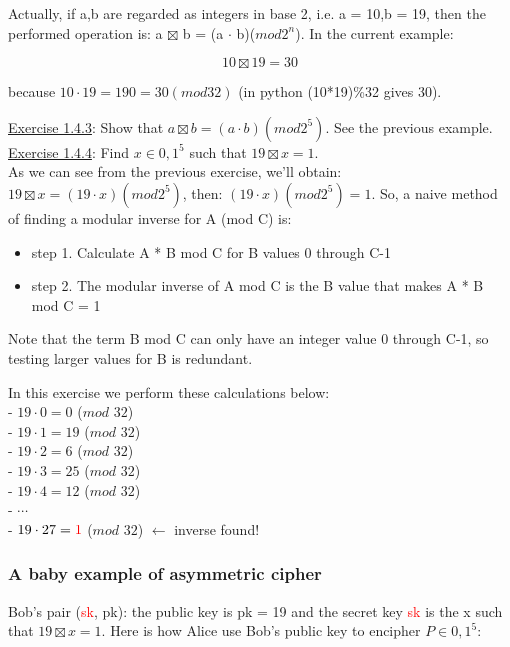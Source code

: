 \documentclass{article}
\begin{document}
Actually, if a,b are regarded as integers in base 2, i.e. a = 10,b = 19, then the performed operation is: a $\boxtimes$ b = (a $\cdot$ b)($mod 2^n$). In the current example:

\begin{equation*}
    10 \boxtimes 19 = 30
\end{equation*}

because $10 \cdot 19 = 190 = 30 (mod 32)$ (in python (10*19)\%32 gives 30).

\underline{Exercise 1.4.3}: Show that $a \boxtimes b = (a \cdot b)(mod 2^5)$. See the previous example.\\


\underline{Exercise 1.4.4}: Find $x \in {0,1}^5$ such that $19 \boxtimes x = 1$.\\
As we can see from the previous exercise, we'll obtain: $19 \boxtimes x = (19 \cdot x)(mod 2^5)$, then: $(19 \cdot x)(mod 2^5) = 1$. So, a naive method of finding a modular inverse for A (mod C) is:
\begin{itemize}
    \item step 1. Calculate A * B mod C for B values 0 through C-1
    \item step 2. The modular inverse of A mod C is the B value that makes A * B mod C = 1
\end{itemize}
Note that the term B mod C can only have an integer value 0 through C-1, so testing larger values for B is redundant.

In this exercise we perform these calculations below:\\
- $19 \cdot 0 = 0$ ($mod$ $32$)\\
- $19 \cdot 1 = 19$ ($mod$ $32$)\\
- $19 \cdot 2 = 6$ ($mod$ $32$)\\
- $19 \cdot 3 = 25$ ($mod$ $32$)\\
- $19 \cdot 4 = 12$ ($mod$ $32$)\\
-   $\cdots$ \\
- $19 \cdot 27 = \textcolor{red}{1}$ ($mod$ $32$) $\longleftarrow$ inverse found!\\


\subsubsection{A baby example of asymmetric cipher}
Bob's pair (\textcolor{red}{sk}, pk): the public key is pk = 19 and the secret key \textcolor{red}{sk} is the x such that $19 \boxtimes x = 1$. Here is how Alice use Bob's public key to encipher $P \in {0,1}^5$:
\end{document}
